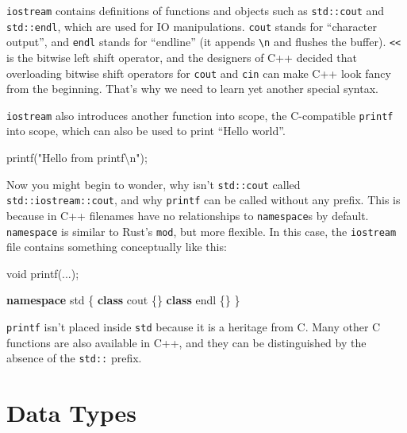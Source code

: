 \documentclass[
]{book}
\newenvironment{Shaded}{\begin{snugshade}}{\end{snugshade}}
\newcommand{\DataTypeTok}[1]{\textcolor[rgb]{0.13,0.29,0.53}{#1}}
\newcommand{\KeywordTok}[1]{\textcolor[rgb]{0.13,0.29,0.53}{\textbf{#1}}}
\newcommand{\NormalTok}[1]{#1}
\newcommand{\SpecialCharTok}[1]{\textcolor[rgb]{0.00,0.00,0.00}{#1}}
\newcommand{\StringTok}[1]{\textcolor[rgb]{0.31,0.60,0.02}{#1}}
\begin{document}
\texttt{iostream} contains definitions of functions and objects such as \texttt{std::cout} and
\texttt{std::endl}, which are used for IO manipulations. \texttt{cout} stands for ``character
output'', and \texttt{endl} stands for ``endline'' (it appends \texttt{\textbackslash{}n} and flushes the buffer).
\texttt{\textless{}\textless{}} is the bitwise left shift operator, and the designers of C++ decided that
overloading bitwise shift operators for \texttt{cout} and \texttt{cin} can make C++ look fancy
from the beginning. That's why we need to learn yet another special syntax.

\texttt{iostream} also introduces another function into scope, the C-compatible \texttt{printf} into scope,
which can also be used to print ``Hello world''.

\begin{Shaded}
\begin{Highlighting}[]
\NormalTok{printf(}\StringTok{"Hello from printf}\SpecialCharTok{\textbackslash{}n}\StringTok{"}\NormalTok{);}
\end{Highlighting}
\end{Shaded}

Now you might begin to wonder, why isn't \texttt{std::cout} called \texttt{std::iostream::cout},
and why \texttt{printf} can be called without any prefix. This is because in C++ filenames
have no relationships to \texttt{namespace}s by default. \texttt{namespace} is similar to Rust's \texttt{mod},
but more flexible. In this case, the \texttt{iostream} file contains something conceptually like this:

\begin{Shaded}
\begin{Highlighting}[]
\DataTypeTok{void}\NormalTok{ printf(...);}

\KeywordTok{namespace}\NormalTok{ std \{}
    \KeywordTok{class}\NormalTok{ cout \{\}}
    \KeywordTok{class}\NormalTok{ endl \{\}}
\NormalTok{\}}
\end{Highlighting}
\end{Shaded}

\texttt{printf} isn't placed inside \texttt{std} because it is a heritage from C. Many other C functions
are also available in C++, and they can be distinguished by the absence of the \texttt{std::} prefix.

\hypertarget{data-types}{%
\section{Data Types}\label{data-types}}
\end{document}
